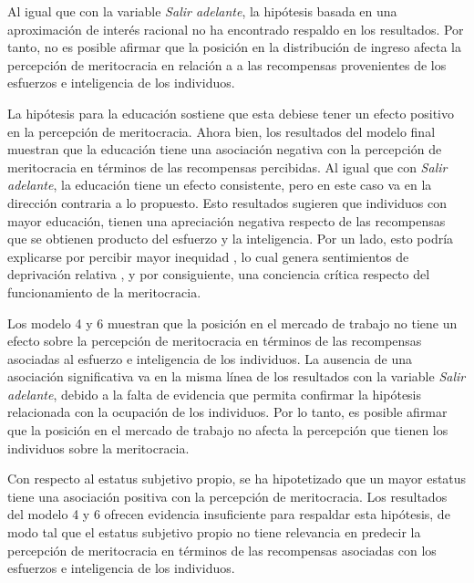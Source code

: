 \documentclass[12pt]{article}
\renewcommand{\baselinestretch}{1.5} %
\begin{document}
Al igual que con la variable \textit{Salir adelante}, la hipótesis basada en una aproximación de interés racional no ha encontrado respaldo en los resultados. Por tanto, no es posible afirmar que la posición en la distribución de ingreso afecta la percepción de meritocracia en relación a a las recompensas provenientes de los esfuerzos e inteligencia de los individuos. 

La hipótesis para la educación sostiene que esta debiese tener un efecto positivo en la percepción de meritocracia. Ahora bien, los resultados del modelo final muestran que la educación tiene una asociación negativa con la percepción de meritocracia en términos de las recompensas percibidas. Al igual que con \textit{Salir adelante}, la educación tiene un efecto consistente, pero en este caso va en la dirección contraria a lo propuesto. Esto resultados sugieren que individuos con mayor educación, tienen una apreciación negativa respecto de las recompensas que se obtienen producto del esfuerzo y la inteligencia. Por un lado, esto podría explicarse por percibir mayor inequidad \citep{Adams1965}, lo cual genera sentimientos de deprivación relativa \citep{Merton1968}, y por consiguiente, una conciencia crítica respecto del funcionamiento de la meritocracia.

Los modelo 4 y 6 muestran que la posición en el mercado de trabajo no tiene un efecto sobre la percepción de meritocracia en términos de las recompensas asociadas al esfuerzo e inteligencia de los individuos. La ausencia de una asociación significativa va en la misma línea de los resultados con la variable \textit{Salir adelante}, debido a la falta de evidencia que permita confirmar la hipótesis relacionada con la ocupación de los individuos. Por lo tanto, es posible afirmar que la posición en el mercado de trabajo no afecta la percepción que tienen los individuos sobre la meritocracia.   

\renewcommand{\arraystretch}{0.6}
\renewcommand{\baselinestretch}{1}

\restoregeometry 

Con respecto al estatus subjetivo propio, se ha hipotetizado que un mayor estatus tiene una asociación positiva con la percepción de meritocracia. Los resultados del modelo 4 y 6 ofrecen evidencia insuficiente para respaldar esta hipótesis, de modo tal que el estatus subjetivo propio no tiene relevancia en predecir la percepción de meritocracia en términos de las recompensas asociadas con los esfuerzos e inteligencia de los individuos. 
\end{document}
